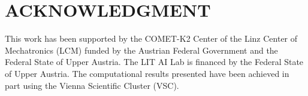 \documentclass[a4paper]{article}
\begin{document}
\section{ACKNOWLEDGMENT}
This work has been supported by the COMET-K2 Center of the Linz Center of Mechatronics (LCM) funded by the Austrian Federal Government and the Federal State of Upper Austria.
The LIT AI Lab is financed by the Federal State of
Upper Austria. The computational results presented have been achieved in part using the Vienna Scientific Cluster (VSC).



\end{document}
